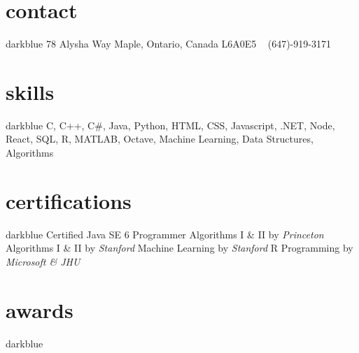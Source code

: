 \documentclass{resume}
\begin{document}
	\begin{sidebar}
		\vspace{-5pt}%
		\section{contact}{darkblue}
			78 Alysha Way
			Maple, Ontario, Canada
			L6A0E5
			~
			(647)-919-3171
			~
		\section{skills}{darkblue}
			\color{bodyText}C, C++, C\#, Java, Python,
			HTML, CSS, Javascript, .NET, 
			Node, React, SQL, R, MATLAB,
			Octave, Machine Learning,
			Data Structures, Algorithms
		\section{certifications}{darkblue}
			Certified Java SE 6 Programmer
			Algorithms I \& II by \emph{Princeton}
			Algorithms I \& II by \emph{Stanford}
			Machine Learning by \emph{Stanford}
			R Programming by \emph{Microsoft \& JHU}
		\section{awards}{darkblue}
			\begin{entrylist}
			\end{entrylist}
	\end{sidebar}
\end{document}
